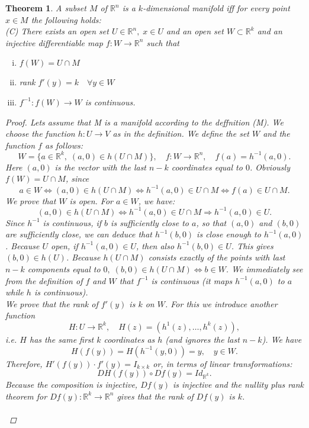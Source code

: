 \documentclass[12pt]{article}
\def\RR{\mathbb{R}}
\newtheorem{theorem}{Theorem}[section]
\begin{document}
\begin{theorem}\label{man1}
A subset $M$ of $\RR^n$ is a $k$-dimensional manifold iff for every point $x \in M$ the following holds:\\
(C) There exists an open set $U \in \RR^n,\; x \in U$ and an open set $W \subset \RR^k$ and an injective
differentiable map $f : W \rightarrow \RR^n$ such that
\begin{enumerate}[(i)]
\item $f(W) = U \cap M$
\item rank $f'(y) = k \quad \forall y \in W$
\item $f^{-1} : f(W) \rightarrow W$ is continuous.
\end{enumerate}
\begin{proof}
 Lets assume that M is a manifold according to the deffnition (M). We choose the function $h : U \rightarrow V$ as in the definition. We define the set $W$ and the function $f$ as follows:
\[W = \{a \in \RR^k, \; (a, 0) \in h(U \cap M) \}, \quad f : W \rightarrow \RR^n, \quad  f(a) = h^{-1}(a, 0).\]
Here $(a, 0)$ is the vector with the last $n-k$ coordinates equal to $0$. Obviously $f(W) = U\cap M$, since
\[a \in W \Leftrightarrow (a, 0) \in h(U \cap M) \Leftrightarrow h^{-1}(a, 0) \in U \cap M \Leftrightarrow f(a) \in U \cap M.\]
We prove that $W$ is open. For $a \in W$, we have:
\[(a, 0) \in h(U \cap M) \Leftrightarrow h^{-1}(a, 0) \in U \cap M \Rightarrow h^{-1}(a, 0) \in U.\]
Since $h^{-1}$ is continuous, if $b$ is sufficiently close to $a$, so that $(a, 0)$ and $(b, 0)$ are sufficiently close, we can deduce that $h^{-1}(b, 0)$ is close enough to $h^{-1}(a, 0)$. Because $U$ open, if $h^{-1}(a, 0) \in U$, then also $h^{-1}(b, 0) \in U$. This gives $(b, 0) \in h(U)$. Because $h(U \cap M)$ consists exactly of the points with last $n- k$ components equal to $0, \; (b, 0) \in h(U\cap M) \Leftrightarrow b \in W$. We immediately see from the definition of $f$ and $W$ that $f^{-1}$ is continuous (it maps $h^{-1}(a, 0)$ to $a$ while $h$ is continuous).\\
We prove that the rank of $f'(y)$ is $k$ on $W$. For this we introduce another function
\[H : U \rightarrow \RR^k, \quad  H(z) = (h^1(z),\dots , h^k(z)),\]
i.e. $H$ has the same first $k$ coordinates as $h$ (and ignores the last $n - k$). We have
\[H(f(y)) = H(h^{-1}(y, 0)) = y, \quad  y \in W.\]
Therefore, $H'(f(y) )\cdot f'(y) = I_{k\times k}$ or, in terms of linear transformations:
\[DH(f(y)) \circ Df(y) = Id_{\RR^k}.\]
Because the composition is injective, $Df(y)$ is injective and the nullity plus rank theorem for $Df(y) : \RR^k \rightarrow \RR^n$ gives that the rank of $Df(y)$ is $k$.\\ \\

\end{proof}
\end{theorem}
\end{document}
